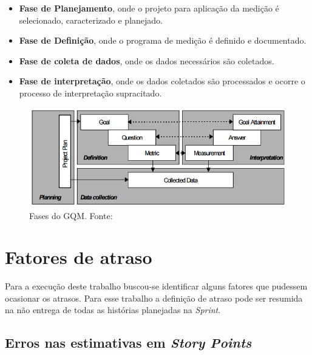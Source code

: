     \begin{itemize}
     
     \item \textbf{Fase de Planejamento}, onde o projeto para aplicação da medição é selecionado, caracterizado e planejado.
     
     \item \textbf{Fase de Definição}, onde o programa de medição é definido e documentado.
     
     \item \textbf{Fase de coleta de dados}, onde os dados necessários são coletados.
     
     \item \textbf{Fase de interpretação}, onde os dados coletados são processados e ocorre o processo de interpretação supracitado.
     
    \end{itemize}
  
    \begin{figure}[!htb]
      \centering
      \includegraphics[scale=0.5]{figuras/gqm_phases}
      \caption[Fases do GQM.]
	      {Fases do GQM. Fonte: \cite{solingen99}}
      \label{gqm_phases}
    \end{figure}
    
\section{Fatores de atraso}

  Para a execução deste trabalho buscou-se identificar alguns fatores que pudessem ocasionar os atrasos. Para esse trabalho a definição de atraso
  pode ser resumida na não entrega de todas as histórias planejadas na \textit{Sprint}.

  \subsection{Erros nas estimativas em \textit{Story Points}}
  

